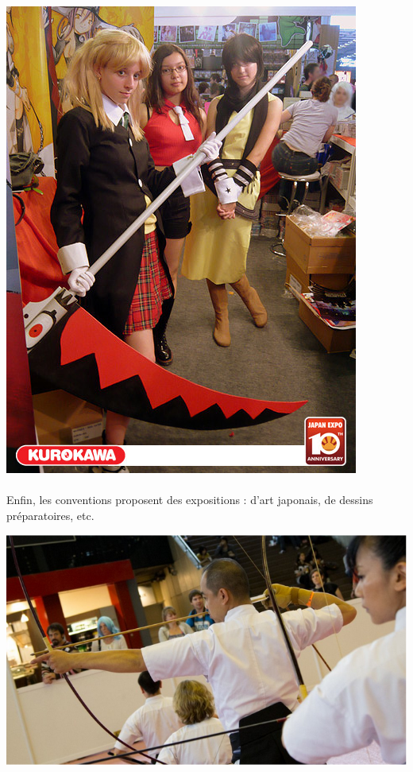 \begin{center}
	\includegraphics[scale=0.3]{cosplay.jpg}
\end{center}

\paragraph{} Enfin, les conventions proposent des expositions : d’art japonais,
de dessins préparatoires, etc.

\begin{center}
	\includegraphics[scale=0.4]{demo.png}
\end{center}


